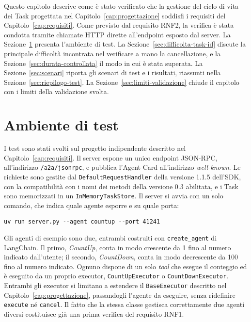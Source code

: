 \label{cap:validazione}

Questo capitolo descrive come è stato verificato che la gestione del ciclo di vita dei Task progettata nel Capitolo~\ref{cap:progettazione} soddisfi i requisiti del Capitolo~\ref{cap:requisiti}. Come previsto dal requisito RNF2, la verifica è stata condotta tramite chiamate HTTP dirette all'endpoint esposto dal server. La Sezione~\ref{sec:ambiente-test} presenta l'ambiente di test. La Sezione~\ref{sec:difficolta-task-id} discute la principale difficoltà incontrata nel verificare a mano la cancellazione, e la Sezione~\ref{sec:durata-controllata} il modo in cui è stata superata. La Sezione~\ref{sec:scenari} riporta gli scenari di test e i risultati, riassunti nella Sezione~\ref{sec:riepilogo-test}. La Sezione~\ref{sec:limiti-validazione} chiude il capitolo con i limiti della validazione svolta.

\section{Ambiente di test}
\label{sec:ambiente-test}

I test sono stati svolti sul progetto indipendente descritto nel Capitolo~\ref{cap:requisiti}. Il server espone un unico endpoint JSON-RPC, all'indirizzo \texttt{/a2a/jsonrpc}, e pubblica l'Agent Card all'indirizzo \emph{well-known}. Le richieste sono gestite dal \texttt{DefaultRequestHandler} della versione 1.1.5 dell'SDK, con la compatibilità con i nomi dei metodi della versione 0.3 abilitata, e i Task sono memorizzati in un \texttt{InMemoryTaskStore}. Il server si avvia con un solo comando, che indica quale agente esporre e su quale porta:

\begin{center}
\begin{minipage}{0.95\linewidth}
\footnotesize
\begin{verbatim}
uv run server.py --agent countup --port 41241
\end{verbatim}
\end{minipage}
\end{center}

Gli agenti di esempio sono due, entrambi costruiti con \texttt{create\_agent} di LangChain. Il primo, \emph{CountUp}, conta
 in modo crescente da 1 fino al numero indicato dall'utente; il secondo, \emph{CountDown}, conta in modo decrescente da 100 fino al numero indicato.
  Ognuno dispone di un solo \emph{tool} che esegue il conteggio ed è eseguito da un proprio executor, \texttt{CountUpExecutor} o \texttt{CountDownExecutor}.
   Entrambi gli executor si limitano a estendere il \texttt{BaseExecutor} descritto nel Capitolo~\ref{cap:progettazione}, passandogli l'agente da eseguire, 
   senza ridefinire \texttt{execute} né \texttt{cancel}. Il fatto che la stessa classe gestisca correttamente due agenti diversi costituisce già una prima verifica 
   del requisito RNF1.

